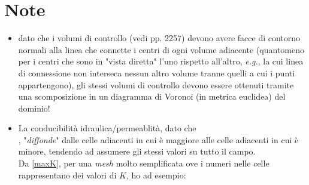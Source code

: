 \documentclass[
10pt, %
a4paper, %
oneside, %
headinclude,footinclude, %
BCOR5mm, %
]{scrartcl}
\begin{document}
\section{Note}
\begin{itemize}\itemsep0pt
	\item dato che i volumi di controllo (vedi \cite{Casulli2010} pp. 2257) devono avere facce di contorno normali alla linea che connette i centri di ogni volume adiacente (quantomeno per i centri che sono in "vista diretta" l'uno rispetto all'altro, \emph{e.g.}, la cui linea di connessione non interseca nessun altro volume tranne quelli a cui i punti appartengono), gli stessi volumi di controllo devono essere ottenuti tramite una scomposizione in un diagramma di Voronoi (in metrica euclidea) del dominio!
	\item La conducibilità idraulica/permeablità, dato che \\, "\emph{diffonde}" dalle celle adiacenti in cui è maggiore alle celle adiacenti in cui è minore, tendendo ad assumere gli stessi valori su tutto il campo.\\
	Da \ref{maxK}, per una \emph{mesh} molto semplificata ove i numeri nelle celle rappresentano dei valori di $K$, ho ad esempio: \\
	\\
		\begin{figure}[!h]
		\centering
		\hspace{1cm}
\end{figure}
\end{itemize}
\end{document}
